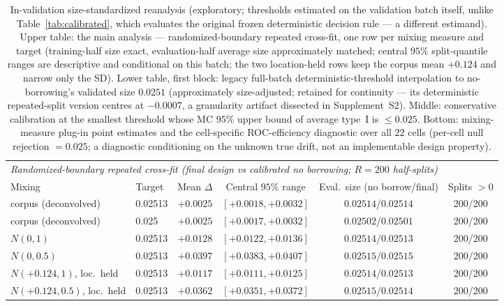 \documentclass[11pt]{article}
\begin{document}
\begin{table}[htbp]
\centering
\small
\setlength{\tabcolsep}{4pt}
\caption{In-validation size-standardized reanalysis (exploratory;
thresholds
estimated on the validation batch itself, unlike
Table~\ref{tab:calibrated}, which evaluates the original frozen
deterministic decision rule --- a different estimand). Upper table:
the main analysis --- randomized-boundary repeated cross-fit, one row
per mixing measure and target (training-half size exact,
evaluation-half average size approximately matched; central $95\%$
split-quantile ranges are descriptive and conditional on this batch;
the two location-held rows keep the corpus mean $+0.124$ and narrow
only the SD). Lower table, first block: legacy full-batch
deterministic-threshold interpolation to
no-borrowing's validated size $0.0251$ (approximately size-adjusted;
retained for continuity --- its deterministic repeated-split version
centres at $-0.0007$, a granularity artifact dissected in
Supplement~S2). Middle:
conservative
calibration at the smallest threshold whose MC $95\%$ upper bound of
average type~I is $\le 0.025$. Bottom: mixing-measure plug-in point
estimates and the cell-specific ROC-efficiency
diagnostic over all $22$ cells (per-cell null rejection $= 0.025$; a
diagnostic conditioning on the unknown true drift, not an implementable
design property).}
\label{tab:sizematched}
\setlength{\tabcolsep}{3pt}
\begin{tabular}{llcccc}
\hline
\multicolumn{6}{l}{\emph{Randomized-boundary repeated cross-fit
(final design vs calibrated no borrowing; $R = 200$ half-splits)}}\\
Mixing & Target & Mean $\Delta$ & Central $95\%$ range &
Eval.\ size (no borrow/final) & Splits $>0$ \\
\hline
corpus (deconvolved) & 0.02513 & $+0.0025$ & $[+0.0018,+0.0032]$ &
$0.02514$/$0.02514$ & 200/200 \\
corpus (deconvolved) & 0.025 & $+0.0025$ & $[+0.0017,+0.0032]$ &
$0.02502$/$0.02501$ & 200/200 \\
$N(0, 1)$ & 0.02513 & $+0.0128$ & $[+0.0122,+0.0136]$ &
$0.02514$/$0.02513$ & 200/200 \\
$N(0, 0.5)$ & 0.02513 & $+0.0397$ & $[+0.0383,+0.0407]$ &
$0.02515$/$0.02515$ & 200/200 \\
$N(+0.124, 1)$, loc.\ held & 0.02513 & $+0.0117$ &
$[+0.0111,+0.0125]$ & $0.02514$/$0.02513$ & 200/200 \\
$N(+0.124, 0.5)$, loc.\ held & 0.02513 & $+0.0362$ &
$[+0.0351,+0.0372]$ & $0.02515$/$0.02514$ & 200/200 \\
\hline
\end{tabular}


\end{table}
\end{document}
